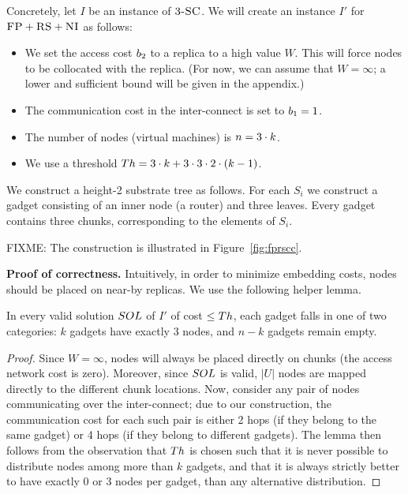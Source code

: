 Concretely, let $I$ be an instance of $\textsc{3-SC}$. We will create an instance $I'$
for $\textsc{FP}+\textsc{RS}+\textsc{NI}$ as follows: 
\begin{itemize}
\item We set the access cost $b_2$ to a replica to a high value $W$. This will force
nodes to be collocated with the replica.
(For now, we can assume that $W=\infty$; a lower and sufficient bound will be given
in the appendix.)
\item The communication cost in the inter-connect is set to $b_1 = 1$.
\item The number of nodes (virtual machines) is $n = 3 \cdot k$.
\item We use a threshold $Th =  3 \cdot k + 3 \cdot 3 \cdot 2 \cdot (k - 1)$.
\end{itemize}

We construct a height-2 substrate tree 
as follows. For each $S_i$ we construct a gadget
consisting of an inner node (a router) and three leaves. Every gadget
contains three chunks, corresponding to the elements of $S_i$.

FIXME: The construction is illustrated in Figure~\ref{fig:fprscc}.

\textbf{Proof of correctness.}
Intuitively, in order to minimize embedding costs,
nodes should be placed on near-by replicas. We use the following
helper lemma. 
\begin{lemma}\label{lemma:helper}
In every valid solution $SOL$ of $I'$ of cost $\leq Th$, each gadget
falls in one of two categories: 
$k$ gadgets have exactly
$3$ nodes, and $n-k$ gadgets remain empty.
\end{lemma}
\begin{proof}
Since $W=\infty$, nodes will always be placed
directly on chunks (the access network cost is zero). 
Moreover, since
$SOL$ is valid, $|U|$ nodes are mapped
directly to the different chunk locations. 
Now, consider any pair of nodes communicating over the
inter-connect; due to our construction, the communication cost 
for each such pair is either 
2 hops (if they belong to the same gadget) or 4 hops (if they belong
to different gadgets). 
The lemma then follows from the observation that $Th$
is chosen such that it is never possible to distribute nodes
among more than $k$ gadgets, and that it is always strictly better to
have exactly 0 or 3 nodes per gadget, than any alternative distribution.
\end{proof}

